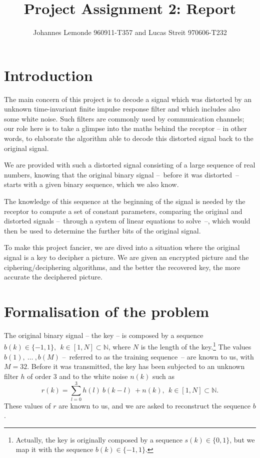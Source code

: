 \documentclass[twocolumn, 12pt]{IEEEtran}
\begin{document}
\title{Project Assignment 2: Report}
\author{Johannes Lemonde 960911-T357 and Lucas Streit 970606-T232}

\maketitle

\section{Introduction}

The main concern of this project is to decode a signal which was distorted by an unknown time-invariant finite impulse response filter and which includes also some white noise. Such filters are commonly used by communication channels; our role here is to take a glimpse into the maths behind the receptor -- in other words, to elaborate the algorithm able to decode this distorted signal back to the original signal.

We are provided with such a distorted signal consisting of a large sequence of real numbers, knowing that the original binary signal --~before it was distorted~-- starts with a given binary sequence, which we also know.

The knowledge of this sequence at the beginning of the signal is needed by the receptor to compute a set of constant parameters, comparing the original and distorted signals --~through a system of linear equations to solve~--, which would then be used to determine the further bits of the original signal.

To make this project fancier, we are dived into a situation where the original signal is a key to decipher a picture. We are given an encrypted picture and the ciphering/deciphering algorithms, and the better the recovered key, the more accurate the deciphered picture.

\section{Formalisation of the problem}

 The original binary signal -- the key -- is composed by a sequence ${b(k)\in \{-1,1\}}, ~~{k\in[1, N]\subset\mathbb{N}}$, where $N$ is the length of the key.\footnote{Actually, the key is originally composed by a sequence ${s(k)\in\{0,1\}}$, but we map it with the sequence ${b(k)\in\{-1, 1\}}$.}
 The values ${b(1),~\dots~, b(M)}$ --~referred to as the training sequence~-- are known to us, with ${M=32}$.
 Before it was transmitted, the key has been subjected to an unknown filter $h$ of order ${3}$ and to the white noise $n(k)$ such as 
 \begin{equation}\label{eq:r}
 { r(k) = \sum\limits_{l=0}^{3}h(l)~b(k-l)~+n(k),~~k\in[1,N]\subset\mathbb{N} }.
 \end{equation}
 These values of $r$ are known to us, and we are asked to reconstruct the sequence $b$.
 
\end{document}
